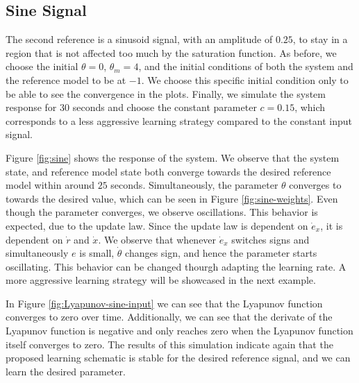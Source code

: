 \subsection{Sine Signal}
The second reference is a sinusoid signal, with an amplitude of $0.25$, to stay in a region that is not affected too much by the saturation function. As before, we choose the initial $\theta = 0$, $\theta_m = 4$, and the initial conditions of both the system and the reference model to be at $-1$. We choose this specific initial condition only to be able to see the convergence in the plots. Finally, we simulate the system response for $30$ seconds and choose the constant parameter $c=0.15$, which corresponds to a less aggressive learning strategy compared to the constant input signal.

Figure \ref{fig:sine} shows the response of the system. We observe that the system state, and reference model state both converge towards the desired reference model within around $25$ seconds. Simultaneously, the parameter $\theta$ converges to towards the desired value, which can be seen in Figure \ref{fig:sine-weights}. Even though the parameter converges, we observe oscillations. This behavior is expected, due to the update law. Since the update law is dependent on $\dot e_x$, it is dependent on $\dot r$ and $\dot x$. We observe that whenever $\dot e_x$ switches signs and simultaneously $e$ is small, $\dot \theta$ changes sign, and hence the parameter starts oscillating. This behavior can be changed thourgh adapting the learning rate. A more aggressive learning strategy will be showcased in the next example.

In Figure \ref{fig:Lyapunov-sine-input} we can see that the Lyapunov function converges to zero over time. Additionally, we can see that the derivate of the Lyapunov function is negative and only reaches zero when the Lyapunov function itself converges to zero. The results of this simulation indicate again that the proposed learning schematic is stable for the desired reference signal, and we can learn the desired parameter.


